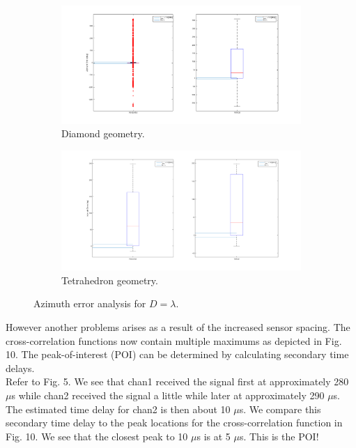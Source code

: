 \documentclass[12pt]{article}
\begin{document}
\begin{figure}[!h]
	\centering
	\begin{subfigure}{.5\textwidth}
  		\centering
  		\includegraphics[width=.85\linewidth]{Pics_and_Figs/Error_Analysis_Diamond_One.png}
  		\caption{Diamond geometry.}
  		\label{fig:Error_Analysis_Diamond_One}
	\end{subfigure}%
	\begin{subfigure}{.5\textwidth}
  		\centering
  		\includegraphics[width=.85\linewidth]{Pics_and_Figs/Error_Analysis_Tetra_One.png}
  		\caption{Tetrahedron geometry.}
  		\label{fig:Error_Analysis_Tetra_One}
	\end{subfigure}
	\caption{Azimuth error analysis for $D=\lambda$.}
\end{figure}

\noindent However another problems arises as a result of the increased sensor spacing. The cross-correlation functions now contain multiple maximums as depicted in Fig. 10. The peak-of-interest (POI) can be determined by calculating secondary time delays.\\

\noindent Refer to Fig. 5. We see that chan1 received the signal first at approximately 280 $\mu$s while chan2 received the signal a little while later at approximately 290 $\mu$s. The estimated time delay for chan2 is then about 10 $\mu$s. We compare this secondary time delay to the peak locations for the cross-correlation function in Fig. 10. We see that the closest peak to 10 $\mu$s is at 5 $\mu$s. This is the POI!
\end{document}
